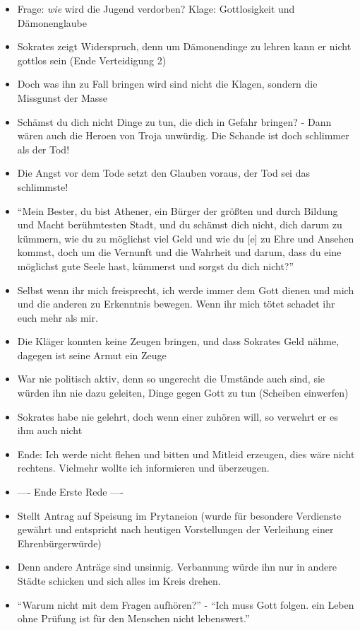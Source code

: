 \documentclass[emulatestandardclasses]{scrartcl}
\begin{document}
\begin{itemize}
  \item Frage: \emph{wie} wird die Jugend verdorben? Klage: Gottlosigkeit und Dämonenglaube
  \item Sokrates zeigt Widerspruch, denn um Dämonendinge zu lehren kann er nicht gottlos sein (Ende Verteidigung 2)
  \item Doch was ihn zu Fall bringen wird sind nicht die Klagen, sondern die Missgunst der Masse
  \item Schämst du dich nicht Dinge zu tun, die dich in Gefahr bringen? - Dann wären auch die Heroen von Troja unwürdig. Die Schande ist doch schlimmer als der Tod!
  \item Die Angst vor dem Tode setzt den Glauben voraus, der Tod sei das schlimmste!
  \item "`Mein Bester, du bist Athener, ein Bürger der größten und durch Bildung und Macht berühmtesten Stadt, und du schämst dich nicht, dich darum zu kümmern, wie du zu möglichst viel Geld und wie du [e] zu Ehre und Ansehen kommst, doch um die Vernunft und die Wahrheit und darum, dass du eine möglichst gute Seele hast, kümmerst und sorgst du dich nicht?"'
  \item Selbst wenn ihr mich freisprecht, ich werde immer dem Gott dienen und mich und die anderen zu Erkenntnis bewegen. Wenn ihr mich tötet schadet ihr euch mehr als mir.
  \item Die Kläger konnten keine Zeugen bringen, und dass Sokrates Geld nähme, dagegen ist seine Armut ein Zeuge
  \item War nie politisch aktiv, denn so ungerecht die Umstände auch sind, sie würden ihn nie dazu geleiten, Dinge gegen Gott zu tun (Scheiben einwerfen)
  \item Sokrates habe nie gelehrt, doch wenn einer zuhören will, so verwehrt er es ihm auch nicht
  \item Ende: Ich werde nicht flehen und bitten und Mitleid erzeugen, dies wäre nicht rechtens. Vielmehr wollte ich informieren und überzeugen.
  \item ---- Ende Erste Rede ----
  \item Stellt Antrag auf Speisung im Prytaneion (wurde für besondere Verdienste gewährt und entspricht nach heutigen Vorstellungen der Verleihung einer Ehrenbürgerwürde)
  \item Denn andere Anträge sind unsinnig. Verbannung würde ihn nur in andere Städte schicken und sich alles im Kreis drehen. 
  \item "`Warum nicht mit dem Fragen aufhören?"' - "`Ich muss Gott folgen. ein Leben ohne Prüfung ist für den Menschen nicht lebenswert."'

\end{itemize}
\end{document}
